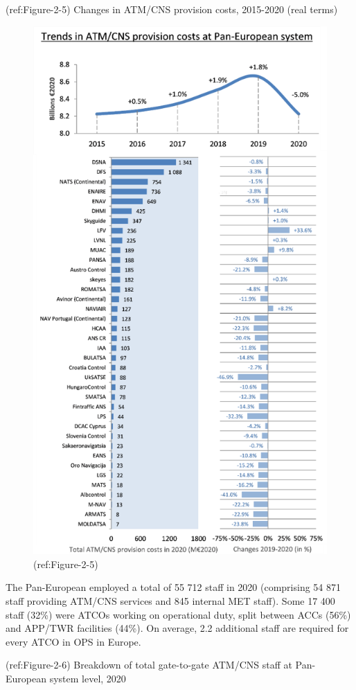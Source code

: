\documentclass[
]{book}
\begin{document}
(ref:Figure-2-5) Changes in ATM/CNS provision costs, 2015-2020 (real
terms)

\begin{figure}

{\centering \includegraphics[width=0.7\linewidth]{figures/Figure-2-5} 

}

\caption{(ref:Figure-2-5)}\label{fig:Figure-2-5}
\end{figure}

The Pan-European employed a total of 55 712 staff in 2020 (comprising 54
871 staff providing ATM/CNS services and 845 internal MET staff). Some
17 400 staff (32\%) were ATCOs working on operational duty, split
between ACCs (56\%) and APP/TWR facilities (44\%). On average, 2.2
additional staff are required for every ATCO in OPS in Europe.

(ref:Figure-2-6) Breakdown of total gate-to-gate ATM/CNS staff at
Pan-European system level, 2020
\end{document}
